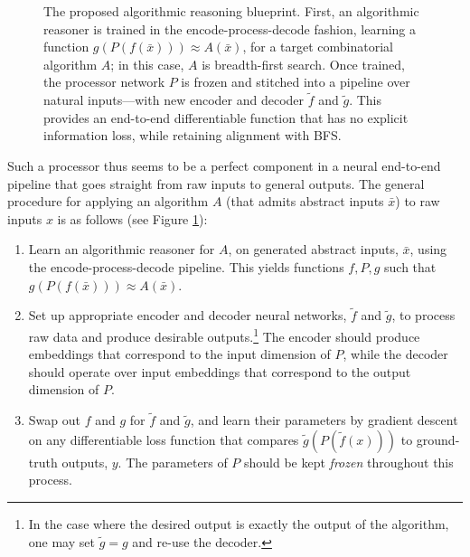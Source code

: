 \documentclass[twoside,11pt]{article}
\begin{document}
\begin{figure}
{}

	\caption{The proposed algorithmic reasoning blueprint. First, an algorithmic reasoner is trained in the encode-process-decode fashion, learning a function $g(P(f(\bar{x})))\approx  A(\bar{x})$, for a target combinatorial algorithm $A$; in this case, $A$ is breadth-first search. Once trained, the processor network $P$ is {frozen} and stitched into a pipeline over natural inputs---with new encoder and decoder $\tilde{f}$ and $\tilde{g}$. This provides an end-to-end differentiable function that has no explicit information loss, while retaining alignment with BFS.}
	\label{algo_pipe}
\end{figure}

Such a processor thus seems to be a perfect component in a neural end-to-end pipeline that goes straight from raw inputs to general outputs. The general procedure for applying an algorithm $A$ (that admits abstract inputs $\bar{x}$) to raw inputs $x$ is as follows (see Figure \ref{algo_pipe}):
\begin{enumerate}
	\item Learn an algorithmic reasoner for $A$, on generated abstract inputs, $\bar{x}$, using the encode-process-decode pipeline. This yields functions $f, P, g$ such that $g(P(f(\bar{x}))) \approx A(\bar{x})$.
	\item Set up appropriate encoder and decoder neural networks, $\tilde{f}$ and $\tilde{g}$, to process raw data and produce desirable outputs.\footnote{In the case where the desired output is exactly the output of the algorithm, one may set $\tilde{g} = g$ and re-use the decoder.} The encoder should produce embeddings that correspond to the input dimension of $P$, while the decoder should operate over input embeddings that correspond to the output dimension of $P$.
	\item Swap out $f$ and $g$ for $\tilde{f}$ and $\tilde{g}$, and learn their parameters by gradient descent on any differentiable loss function that compares $\tilde{g}(P(\tilde{f}(x)))$ to ground-truth outputs, $y$. The parameters of $P$ should be kept \emph{frozen} throughout this process.
\end{enumerate}
\end{document}
